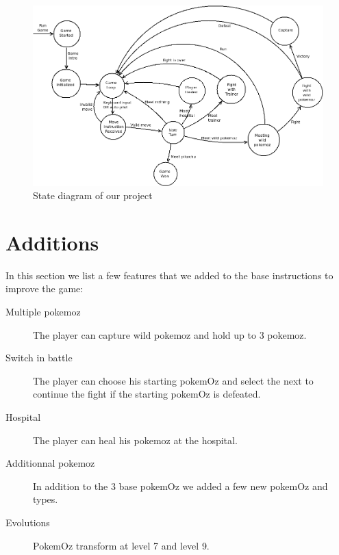 \documentclass[10pt, a4paper]{article}
\begin{document}
\begin{figure}[!ht]
 \includegraphics[width=\linewidth]{State_diagram_oz.png}
 \caption{State diagram of our project}
\end{figure}

\section{Additions}

In this section we list a few features that we added to the base instructions to improve the game:
\begin{description}
  \item [Multiple pokemoz] The player can capture wild pokemoz and hold up to 3 pokemoz.
  \item [Switch in battle] The player can choose his starting pokemOz and select the next to continue the fight if the starting pokemOz is defeated.
  \item [Hospital] The player can heal his pokemoz at the hospital.
  \item [Additionnal pokemoz] In addition to the 3 base pokemOz we added a few new pokemOz and types.
  \item [Evolutions] PokemOz transform at level 7 and level 9.
\end{description}
\end{document}
